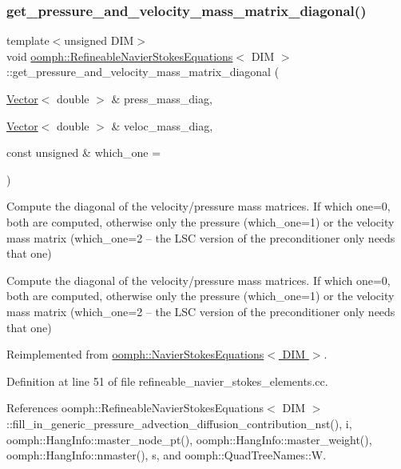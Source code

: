 \subsubsection{\texorpdfstring{get\+\_\+pressure\+\_\+and\+\_\+velocity\+\_\+mass\+\_\+matrix\+\_\+diagonal()}{get\_pressure\_and\_velocity\_mass\_matrix\_diagonal()}}
{\footnotesize\ttfamily template$<$unsigned D\+IM$>$ \\
void \hyperlink{classoomph_1_1RefineableNavierStokesEquations}{oomph\+::\+Refineable\+Navier\+Stokes\+Equations}$<$ D\+IM $>$\+::get\+\_\+pressure\+\_\+and\+\_\+velocity\+\_\+mass\+\_\+matrix\+\_\+diagonal (\begin{DoxyParamCaption}\item[{\hyperlink{classoomph_1_1Vector}{Vector}$<$ double $>$ \&}]{press\+\_\+mass\+\_\+diag,  }\item[{\hyperlink{classoomph_1_1Vector}{Vector}$<$ double $>$ \&}]{veloc\+\_\+mass\+\_\+diag,  }\item[{const unsigned \&}]{which\+\_\+one = {} }\end{DoxyParamCaption})\hspace{0.3cm}{\ttfamily [virtual]}}



Compute the diagonal of the velocity/pressure mass matrices. If which one=0, both are computed, otherwise only the pressure (which\+\_\+one=1) or the velocity mass matrix (which\+\_\+one=2 -- the L\+SC version of the preconditioner only needs that one) 

Compute the diagonal of the velocity/pressure mass matrices. If which one=0, both are computed, otherwise only the pressure (which\+\_\+one=1) or the velocity mass matrix (which\+\_\+one=2 -- the L\+SC version of the preconditioner only needs that one) 

Reimplemented from \hyperlink{classoomph_1_1NavierStokesEquations_a2d6e748dd25be78b65f927cd2b257c55}{oomph\+::\+Navier\+Stokes\+Equations$<$ D\+I\+M $>$}.



Definition at line 51 of file refineable\+\_\+navier\+\_\+stokes\+\_\+elements.\+cc.



References oomph\+::\+Refineable\+Navier\+Stokes\+Equations$<$ D\+I\+M $>$\+::fill\+\_\+in\+\_\+generic\+\_\+pressure\+\_\+advection\+\_\+diffusion\+\_\+contribution\+\_\+nst(), i, oomph\+::\+Hang\+Info\+::master\+\_\+node\+\_\+pt(), oomph\+::\+Hang\+Info\+::master\+\_\+weight(), oomph\+::\+Hang\+Info\+::nmaster(), s, and oomph\+::\+Quad\+Tree\+Names\+::W.

